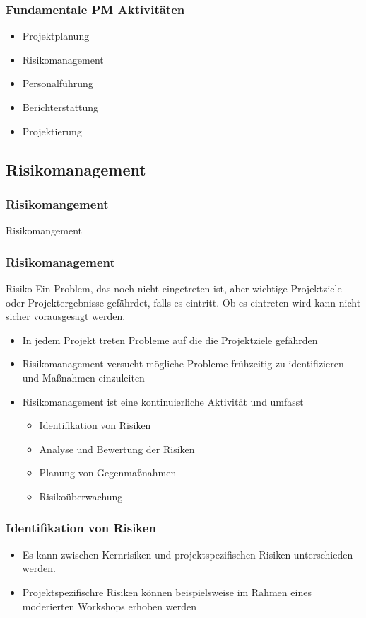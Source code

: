 \begin{frame}
\frametitle{Fundamentale PM Aktivitäten}
	\begin{itemize}
		\item Projektplanung
		\item Risikomanagement
		\item Personalführung
		\item Berichterstattung
		\item Projektierung
	\end{itemize}
\end{frame}

\subsection{Risikomanagement}
\begin{frame}
\frametitle{Risikomangement}
\huge Risikomangement
\end{frame}

\begin{frame}
\frametitle{Risikomanagement}
	\begin{block}{Risiko}
		Ein Problem, das noch nicht eingetreten ist, aber wichtige Projektziele
		oder Projektergebnisse gefährdet, falls es eintritt. Ob es eintreten wird
		kann nicht sicher vorausgesagt werden.
	\end{block}
	\begin{itemize}
		\item In jedem Projekt treten Probleme auf die die Projektziele gefährden
		\item Risikomanagement versucht mögliche Probleme frühzeitig zu identifizieren
		und Maßnahmen einzuleiten
		\item Risikomanagement ist eine kontinuierliche Aktivität und umfasst
		\begin{itemize}
			\item Identifikation von Risiken
			\item Analyse und Bewertung der Risiken
			\item Planung von Gegenmaßnahmen
			\item Risikoüberwachung
		\end{itemize}
	\end{itemize}
\end{frame}

\begin{frame}
\frametitle{Identifikation von Risiken}
	\begin{itemize}
		\item Es kann zwischen Kernrisiken und projektspezifischen Risiken unterschieden werden.
		\item Projektspezifischre Risiken können beispielsweise im Rahmen eines moderierten
		Workshops erhoben werden
	\end{itemize}
\end{frame}

